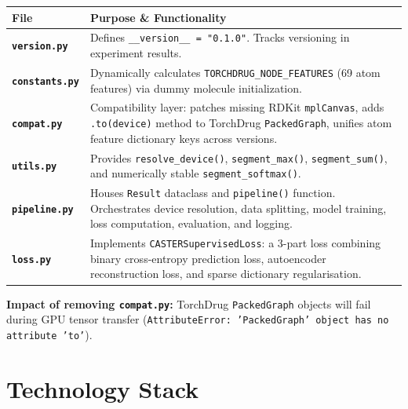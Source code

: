 \documentclass[12pt,a4paper,oneside]{article}
\begin{document}
\begin{longtable}{>{\bfseries}p{4cm}p{10.5cm}}
\toprule
File & Purpose \& Functionality \\
\midrule\endhead
\texttt{version.py} & Defines \texttt{\_\_version\_\_ = "0.1.0"}. Tracks versioning in experiment results. \\
\midrule
\texttt{constants.py} & Dynamically calculates \texttt{TORCHDRUG\_NODE\_FEATURES} (69 atom features) via dummy molecule initialization. \\
\midrule
\texttt{compat.py} & Compatibility layer: patches missing RDKit \texttt{mplCanvas}, adds \texttt{.to(device)} method to TorchDrug \texttt{PackedGraph}, unifies atom feature dictionary keys across versions. \\
\midrule
\texttt{utils.py} & Provides \texttt{resolve\_device()}, \texttt{segment\_max()}, \texttt{segment\_sum()}, and numerically stable \texttt{segment\_softmax()}. \\
\midrule
\texttt{pipeline.py} & Houses \texttt{Result} dataclass and \texttt{pipeline()} function. Orchestrates device resolution, data splitting, model training, loss computation, evaluation, and logging. \\
\midrule
\texttt{loss.py} & Implements \texttt{CASTERSupervisedLoss}: a 3-part loss combining binary cross-entropy prediction loss, autoencoder reconstruction loss, and sparse dictionary regularisation. \\
\bottomrule
\end{longtable}

\begin{tcolorbox}[warnbox]
\textbf{Impact of removing \texttt{compat.py}:} TorchDrug \texttt{PackedGraph} objects will fail during GPU tensor transfer (\texttt{AttributeError: 'PackedGraph' object has no attribute 'to'}).
\end{tcolorbox}

\section{Technology Stack}\label{sec:techstack}
\end{document}
